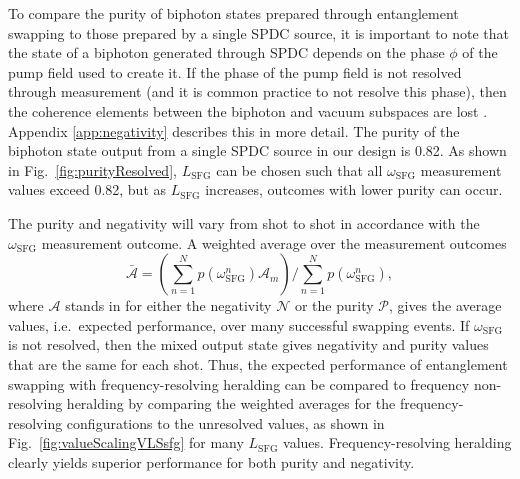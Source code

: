 \documentclass[twocolumn,amssymb, nobibnotes, showpacs, aps, pra,10pt]{revtex4-1}
\newcommand*{\wsfg}{\omega_\textrm{SFG}}
\begin{document}
To compare the purity of biphoton states prepared through entanglement swapping to those prepared by a single SPDC source, it is important to note that the state of a biphoton generated through SPDC depends on the phase $\phi$ of the pump field used to create it. If the phase of the pump field is not resolved through measurement (and it is common practice to not resolve this phase), then the coherence elements between the biphoton and vacuum subspaces are lost \cite{Chou2005}. Appendix \ref{app:negativity} describes this in more detail. The purity of the biphoton state output from a single SPDC source in our design is 0.82. As shown in Fig.\ \ref{fig:purityResolved}, $L_{\text{SFG}}$ can be chosen such that all $\wsfg$ measurement values exceed 0.82, but as $L_{\text{SFG}}$ increases, outcomes with lower purity can occur.

\begin{figure*}[tb]
\begin{center}
\caption{Comparison of the (a) negativity and (b) purity of output states prepared via either frequency resolving or frequency non-resolving heralding over five $L_{\text{SFG}}$ values. The effect of frequency resolution using the same measurement configuration as used in Fig.\ \ref{fig:ResolvedValues} and the weighted average of Eq.\ \eqref{eq:avgNegativity} is shown with the blue points, while the orange points show the values when the SFG photon is detected but $\wsfg$ is unresolved.}
\label{fig:valueScalingVLSsfg}
\end{center}
\end{figure*}

The purity and negativity will vary from shot to shot in accordance with the $\wsfg$ measurement outcome. A weighted average over the measurement outcomes
\begin{equation} \label{eq:avgNegativity}
\bar{\mathcal{A}} = \left( \sum_{n=1}^N p(\omega_{\text{SFG}}^n) \mathcal{A}_m \right) \Bigg/ \sum_{n=1}^N p(\omega_{\text{SFG}}^n),
\end{equation}
where $\mathcal{A}$ stands in for either the negativity $\mathcal{N}$ or the purity $\mathcal{P}$, gives the average values, i.e.\ expected performance, over many successful swapping events. If $\wsfg$ is not resolved, then the mixed output state gives negativity and purity values that are the same for each shot. Thus, the expected performance of entanglement swapping with frequency-resolving heralding can be compared to frequency non-resolving heralding by comparing the weighted averages for the frequency-resolving configurations to the unresolved values, as shown in Fig.\ \ref{fig:valueScalingVLSsfg} for many $L_{\text{SFG}}$ values. Frequency-resolving heralding clearly yields superior performance for both purity and negativity.
\end{document}
